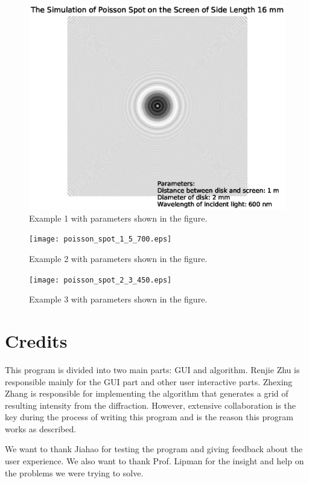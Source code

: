 \documentclass[12pt]{article}
\begin{document}
\begin{figure} [h]
    \includegraphics[width=\textwidth]{poisson_spot_1_2_600.eps}
    \caption{Example 1 with parameters shown in the figure.} 
\end{figure}

\begin{figure} [h]
    \texttt{[image: poisson\_spot\_1\_5\_700.eps]}
    \caption{Example 2 with parameters shown in the figure.} 
\end{figure}

\begin{figure} [h]
    \texttt{[image: poisson\_spot\_2\_3\_450.eps]}
    \caption{Example 3 with parameters shown in the figure.} 
\end{figure}

\section{Credits}

This program is divided into two main parts: GUI 
and algorithm. Renjie Zhu is responsible mainly for the 
GUI part and other user interactive parts. Zhexing Zhang 
is responsible for implementing the algorithm that 
generates a grid of resulting intensity from the diffraction.
However, extensive collaboration is the key during the
process of writing this program and is the reason this 
program works as described.

We want to thank Jiahao for testing the program 
and giving feedback about the user experience. We also
want to thank Prof. Lipman for the insight and help on the 
problems we were trying to solve.
\end{document}

